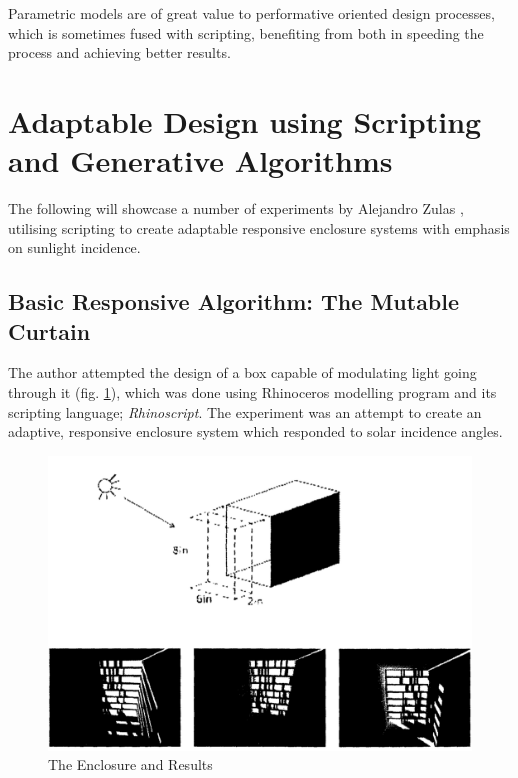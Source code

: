 Parametric models are of great value to performative oriented design processes, which is sometimes fused with scripting, benefiting from both in speeding the process and achieving better results.

\clearpage
\section{Adaptable Design using Scripting and Generative Algorithms}

The following will showcase a number of experiments by Alejandro Zulas \cite{zulas04}, utilising scripting to create adaptable responsive enclosure systems with emphasis on sunlight incidence.

\subsection{Basic Responsive Algorithm: The Mutable Curtain}

The author attempted the design of a box capable of modulating light going through it (fig. \ref{fig:AZulasEncl}), which was done using Rhinoceros modelling program and its scripting language; \emph{Rhinoscript}. The experiment was an attempt to create an adaptive, responsive enclosure system which responded to solar incidence angles. 

\begin{figure}[htbp]
\centering
\includegraphics[width=\textwidth]{./Images/1-Enclosure}
\caption[Responsive Adaptable Enclosure Experiment]{The Enclosure and Results \cite{zulas04}}
\label{fig:AZulasEncl}
\end{figure}

